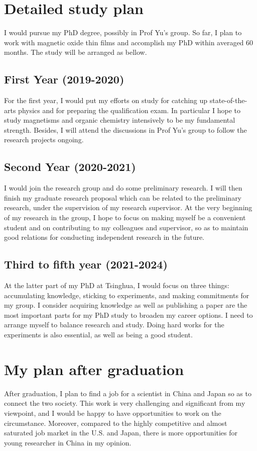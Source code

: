 \documentclass[aps,prb,reprint]{revtex4-1}
\begin{document}
\section{Detailed study plan}
I would pursue my PhD degree, possibly in Prof Yu’s group. So far, I plan to work with magnetic oxide thin films and accomplish my PhD within averaged 60 months. The study will be arranged as bellow. 

\subsection{First Year (2019-2020)}
For the first year, I would put my efforts on study for catching up state-of-the-arts physics and for preparing the qualification exam. In particular I hope to study magnetisms and organic chemistry intensively to be my fundamental strength. Besides, I will attend the discussions in Prof Yu's group to follow the research projects ongoing. 

\subsection{Second Year (2020-2021)}
I would join the research group and do some preliminary research. I will then finish my graduate research proposal which can be related to the preliminary research, under the supervision of my research supervisor.  At the very beginning of my research in the group, I hope to focus on making myself be a convenient student and on contributing to my colleagues and supervisor, so as to maintain good relations for conducting independent research in the future. 

\subsection{Third to fifth year (2021-2024)}
At the latter part of my PhD at Tsinghua, I would focus on three things: accumulating knowledge, sticking to experiments, and making commitments for my group. I consider acquiring knowledge as well as publishing a paper are the most important parts for my PhD study to broaden my career options. I need to arrange myself to balance research and study. Doing hard works for the experiments is also essential, as well as being a good student.

\section{My plan after graduation}
After graduation, I plan to find a job for a scientist in China and Japan so as to connect the two society.  This work is very challenging and significant from my viewpoint, and I would be happy to have opportunities to work on the circumstance. Moreover, compared to the highly competitive and almost saturated job market in the U.S. and Japan, there is more opportunities for young researcher in China in my opinion. 



\end{document}
